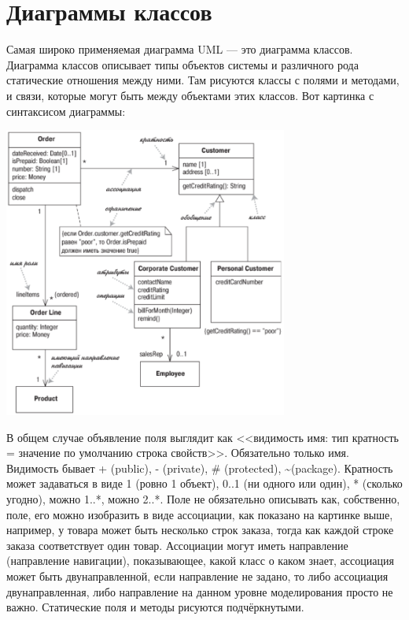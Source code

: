 \documentclass{../../text-style}
\begin{document}
\section{Диаграммы классов}

Самая широко применяемая диаграмма UML --- это диаграмма классов. Диаграмма классов описывает типы объектов системы и различного рода статические отношения между ними. Там рисуются классы с полями и методами, и связи, которые могут быть между объектами этих классов. Вот картинка с синтаксисом диаграммы:

\begin{center}
    \includegraphics[width=0.7\textwidth]{umlClassDiagram.png}
\end{center}

В общем случае объявление поля выглядит как <<видимость имя: тип кратность = значение по умолчанию {строка свойств}>>. Обязательно только имя. Видимость бывает + (public), - (private), \# (protected), \textasciitilde (package). Кратность может задаваться в виде 1 (ровно 1 объект), 0..1 (ни одного или один), * (сколько угодно), можно 1..*, можно 2..*. Поле не обязательно описывать как, собственно, поле, его можно изобразить в виде ассоциации, как показано на картинке выше, например, у товара может быть несколько строк заказа, тогда как каждой строке заказа соответствует один товар. Ассоциации могут иметь направление (направление навигации), показывающее, какой класс о каком знает, ассоциация может быть двунаправленной, если направление не задано, то либо ассоциация двунаправленная, либо направление на данном уровне моделирования просто не важно. Статические поля и методы рисуются подчёркнутыми.
\end{document}
